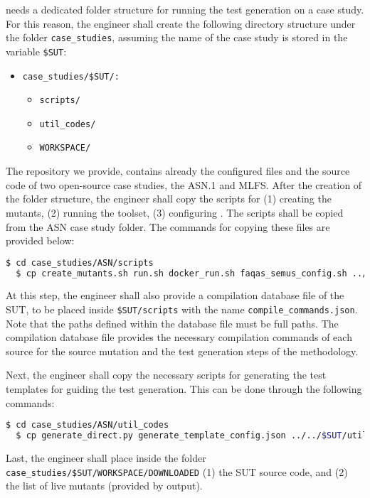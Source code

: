 \SEMUS needs a dedicated folder structure for running the test generation on a case study.
For this reason, the engineer shall create the following directory structure under the folder \texttt{case\_studies}, assuming the name of the case study is stored in the variable \texttt{\$SUT}:

\begin{itemize}
	\item \texttt{case\_studies/\$SUT/:}
	\begin{itemize}
		\item \texttt{scripts/}
		\item \texttt{util\_codes/}
		\item \texttt{WORKSPACE/}
	\end{itemize}
\end{itemize}

The \SEMUS repository we provide, contains already the configured files and the source code of two open-source case studies, the ASN.1 and MLFS.
After the creation of the folder structure, the engineer shall copy the scripts for (1) creating the mutants, (2) running the toolset, (3) configuring \SEMUS. The scripts shall be copied from the ASN case study folder. The commands for copying these files are provided below:

\begin{lstlisting}[language=bash]
  $ cd case_studies/ASN/scripts
  $ cp create_mutants.sh run.sh docker_run.sh faqas_semus_config.sh ../../$SUT/scripts
\end{lstlisting}

At this step, the engineer shall also provide a compilation database file of the SUT, to be placed inside \texttt{\$SUT/scripts} with the name \texttt{compile\_commands.json}. Note that the paths defined within the database file must be full paths. The compilation database file provides the necessary compilation commands of each source for the source mutation and the test generation steps of the methodology.

Next, the engineer shall copy the necessary scripts for generating the test templates for guiding the test generation. This can be done through the following commands:

\begin{lstlisting}[language=bash]
  $ cd case_studies/ASN/util_codes
  $ cp generate_direct.py generate_template_config.json ../../$SUT/util_codes
\end{lstlisting}

Last, the engineer shall place inside the folder \texttt{case\_studies/\$SUT/WORKSPACE/DOWNLOADED} (1) the SUT source code, and (2) the list of live mutants (provided by \MASS output).

